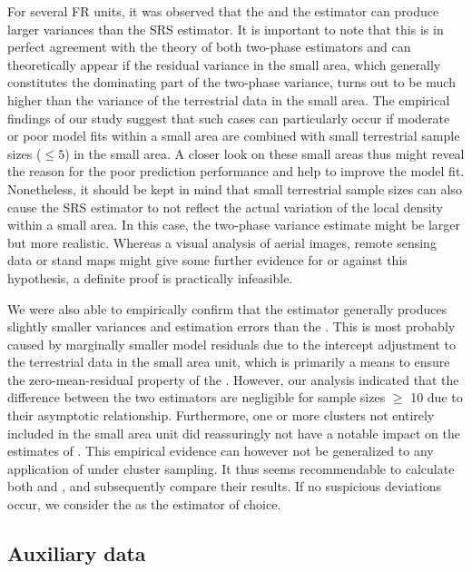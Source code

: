 For several FR units, it was observed that the \psmall{} and the \extpsynth{} estimator can produce larger variances than the SRS estimator. It is important to note that this is in perfect agreement with the theory of both two-phase estimators and can theoretically appear if the residual variance in the small area, which generally constitutes the dominating part of the two-phase variance, turns out to be much higher than the variance of the terrestrial data in the small area. The empirical findings of our study suggest that such cases can particularly occur if moderate or poor model fits within a small area are combined with small terrestrial sample sizes ($\leq 5$) in the small area. A closer look on these small areas thus might reveal the reason for the poor prediction performance and help to improve the model fit. Nonetheless, it should be kept in mind that small terrestrial sample sizes can also cause the SRS estimator to not reflect the actual variation of the local density within a small area. In this case, the two-phase variance estimate might be larger but more realistic. Whereas a visual analysis of aerial images, remote sensing data or stand maps might give some further evidence for or against this hypothesis, a definite proof is practically infeasible.\par

We were also able to empirically confirm that the \extpsynth{} estimator generally produces slightly smaller variances and estimation errors than the \psmall{}. This is most probably caused by marginally smaller model residuals due to the intercept adjustment to the terrestrial data in the small area unit, which is primarily a means to ensure the zero-mean-residual property of the \extpsynth{}. However, our analysis indicated that the difference between the two estimators are negligible for sample sizes $\geq$ 10 due to their asymptotic relationship. Furthermore, one or more clusters not entirely included in the small area unit did reassuringly not have a notable impact on the estimates of \extpsynth{}. This empirical evidence can however not be generalized to any application of \extpsynth{} under cluster sampling. It thus seems recommendable to calculate both \psmall{} and \extpsynth{}, and subsequently compare their results. If no suspicious deviations occur, we consider the \extpsynth{} as the estimator of choice.\par

\subsection{Auxiliary data}


